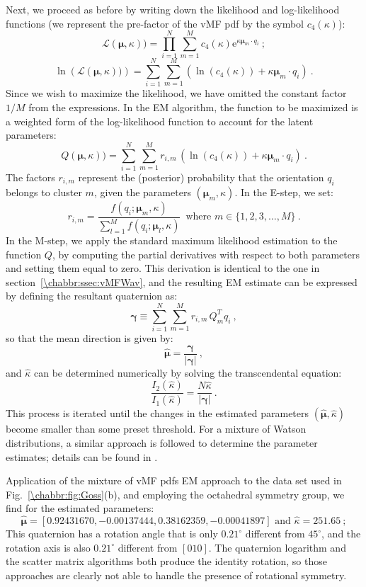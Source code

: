 Next, we proceed as before by writing down the likelihood and log-likelihood functions (we represent the pre-factor of the vMF pdf by the symbol $c_4(\kappa)$):
\[
	\mathcal{L}(\bm{\mu},\kappa)) = \prod_{i=1}^N \sum_{m=1}^M c_4(\kappa)\mathrm{e}^{\kappa\bm{\mu}_m\cdot q_i}\ ;
\]
\[
	\ln\left(\mathcal{L}(\bm{\mu},\kappa))\right) = \sum_{i=1}^N \sum_{m=1}^M \left(\ln(c_4(\kappa))+\kappa\bm{\mu}_m\cdot q_i\right)\ .
\]
Since we wish to maximize the likelihood, we have omitted the constant factor $1/M$ from the expressions.  In the EM algorithm, the function to be maximized is a weighted form of the log-likelihood function to account for the latent parameters:
\[
	Q(\bm{\mu},\kappa)) = \sum_{i=1}^N \sum_{m=1}^M r_{i,m}\,\left(\ln(c_4(\kappa))+\kappa\bm{\mu}_m\cdot q_i\right)\ .
\]
The factors $r_{i,m}$ represent the (posterior) probability that the orientation $q_i$ belongs to cluster $m$, given the parameters $(\bm{\mu}_m,\kappa)$.  In the E-step, we set:
\[
	r_{i,m} = \frac{f(q_i;\bm{\mu}_m,\kappa)}{\sum_{l=1}^M f(q_i;\bm{\mu}_l,\kappa)}\,\text{ where }m\in\{1,2,3,\ldots,M\}\ .
\]
In the M-step, we apply the standard maximum likelihood estimation to the function $Q$, by computing the partial derivatives with respect to both parameters and setting them equal to zero. This derivation is identical to the one in section~\ref{\chabbr:ssec:vMFWav}, and the resulting EM estimate can be expressed by defining the resultant quaternion as:
\[
	\bm{\gamma} \equiv \sum_{i=1}^N \sum_{m=1}^M r_{i,m}\, Q_m^T q_i\ ,
\]
so that the mean direction is given by:
\[
	\hat{\bm{\mu}} = \frac{\bm{\gamma}}{\vert\bm{\gamma}\vert}\ ,
\]
and $\hat{\kappa}$ can be determined numerically by solving the transcendental equation:
\[
	\frac{I_2(\hat{\kappa})}{I_1(\hat{\kappa})} = \frac{N\hat{\kappa}}{\vert\bm{\gamma}\vert}\ .
\]
This process is iterated until the changes in the estimated parameters $(\hat{\bm{\mu}},\hat{\kappa})$ become smaller than some preset threshold. For a mixture of Watson distributions, a similar approach is followed to determine the parameter estimates; details can be found in \cite{degraef2015zg}.

Application of the mixture of vMF pdfs EM approach to the data set used in Fig.~\ref{\chabbr:fig:Goss}(b), and employing the octahedral symmetry group, we find for the estimated parameters:
\[
	\hat{\bm{\mu}} = [0.92431670,-0.00137444, 0.38162359,-0.00041897]\text{ and }\hat{\kappa}=251.65\ ;
\]
This quaternion has a rotation angle that is only $0.21^{\circ}$ different from $45^{\circ}$, and the rotation axis is also $0.21^{\circ}$ different from $[010]$.  The quaternion logarithm and the scatter matrix algorithms both produce the identity rotation, so those approaches are clearly not able to handle the presence of rotational symmetry.



